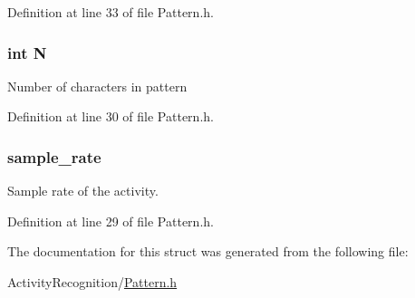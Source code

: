 Definition at line 33 of file Pattern.h.

\hypertarget{struct___pattern_a7722c8ecbb62d99aee7ce68b1752f337}{
\subsubsection[{N}]{\setlength{\rightskip}{0pt plus 5cm}int {\bf N}}}
\label{struct___pattern_a7722c8ecbb62d99aee7ce68b1752f337}
Number of characters in pattern 

Definition at line 30 of file Pattern.h.

\hypertarget{struct___pattern_a699592f96d08e00211f2e1ae82cfeb60}{
\subsubsection[{sample\_\-rate}]{ {\bf sample\_\-rate}}}
\label{struct___pattern_a699592f96d08e00211f2e1ae82cfeb60}
Sample rate of the activity. 

Definition at line 29 of file Pattern.h.



The documentation for this struct was generated from the following file:\begin{DoxyCompactItemize}
\item 
ActivityRecognition/\hyperlink{_pattern_8h}{Pattern.h}\end{DoxyCompactItemize}
